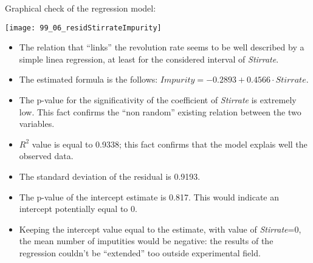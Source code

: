 \begin{frame}
  Graphical check of the regression model:\\
  \vspace{.1cm}
  \begin{center}
    \texttt{[image: 99\_06\_residStirrateImpurity]}
    \end{center}
\end{frame}

\begin{frame}
  \begin{small}
    \begin{itemize}
      \item The relation that ``links'' the revolution rate seems to be well described by a simple linea regression, at least for the considered interval of \textit{Stirrate}.  
      \item The estimated formula is the follows: $ Impurity = -0.2893 + 0.4566 \cdot Stirrate $.
      \item The p-value for the significativity of the coefficient of \textit{Stirrate} is extremely low. This fact confirms the ``non random'' existing relation between the two variables.  
      \item $ R^2 $ value is equal to 0.9338; this fact confirms that the model explais well the observed data.
      \item The standard deviation of the residual is 0.9193.
      \item The p-value of the intercept estimate is 0.817. This would indicate an intercept potentially equal to 0. 
      \item Keeping the intercept value equal to the estimate,  with value of \textit{Stirrate}=0, the mean number of imputities would be negative: the results of the regression couldn't be ``extended'' too outside experimental field. 
    \end{itemize}
  \end{small}
\end{frame}


